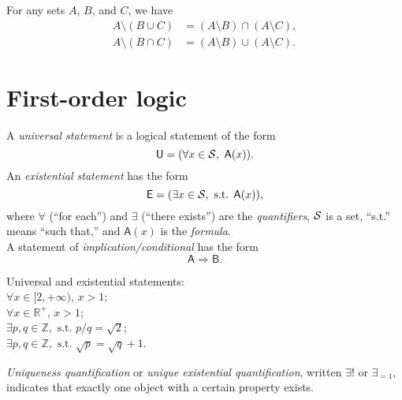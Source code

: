 \begin{thm}
  \label{thm:DeMorganLaws}
  For any sets $A$, $B$, and $C$, we have
  \begin{align}
    \label{eq:DeMorganLaw1}
    A\setminus (B\cup C) &= (A\setminus B) \cap (A\setminus C),
    \\
    \label{eq:DeMorganLaw2}
    A\setminus (B\cap C) &= (A\setminus B) \cup (A\setminus C).
  \end{align}
\end{thm}


\section{First-order logic}
\label{sec:logic}

\begin{defn}
\label{def:uni_exist}
A \emph{universal statement} is a logical statement 
 of the form
\begin{equation}
  \mathsf{U} = (\forall x\in {\cal S},\ \mathsf{A}(x) ).
\end{equation}
An \emph{existential statement} has the form
\begin{equation}
  \mathsf{E} = (\exists x\in {\cal S},\text{ s.t. } \mathsf{A}(x)),
\end{equation}
 where 
 $\forall$ (``for each'') and $\exists$ (``there exists'')
 are the \emph{quantifiers}, ${\cal S}$ is a set,
 ``s.t.'' means ``such that,''
 and $\mathsf{A}(x)$ is the \emph{formula}.\\
A statement of \emph{implication/conditional}
 has the form
 \begin{equation}
   \mathsf{A}\Rightarrow \mathsf{B}.
 \end{equation}
\end{defn}

 \begin{exm}
   Universal and existential statements:\\
   $\forall x\in[2,+\infty)$, $x>1$;\\
   $\forall x\in \mathbb{R}^+$, $x>1$;\\
   $\exists p,q\in \mathbb{Z}, \text{ s.t. } p/q = \sqrt{2}$;\\
   $\exists p,q\in \mathbb{Z}, \text{ s.t. } \sqrt{p} = \sqrt{q}+1$.
 \end{exm}

\begin{defn}
  \emph{Uniqueness quantification}
   or \emph{unique existential quantification},
   written $\exists!$ or $\exists_{=1}$, 
   indicates that exactly one object with a certain property exists.
\end{defn}

